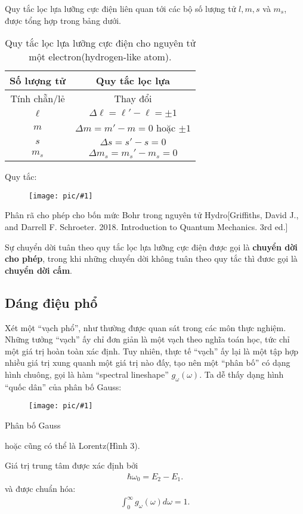 \documentclass{report}
\newcommand{\image}[1]{
\begin{figure}[H]
	\centering
	\texttt{[image: pic/\#1]}
	\label{#1}
\end{figure}
}
\renewcommand{\l}{\ell}
\begin{document}
Quy tắc lọc lựa lưỡng cực điện liên quan tới các bộ số lượng tử $l,m,s$ và $m_s$, được tổng hợp trong bảng dưới.

\begin{table}[h!]
	\centering
	\begin{tabular}{c | c}
		\hline
		Số lượng tử  & Quy tắc lọc lựa                      \\ [0.6ex]
		\hline
		Tính chẵn/lẻ & Thay đổi                             \\
		$\l$         & $\Delta \l = \l' - \l = \pm 1$       \\
		$m$          & $\Delta m = m' - m = 0$ hoặc $\pm 1$ \\
		$s$          & $\Delta s = s' - s = 0 $             \\
		$m_s$        & $\Delta m_s = m_s' - m_s = 0$        \\
		\hline
	\end{tabular}
	\caption{Quy tắc lọc lựa lưỡng cực điện cho nguyên tử một electron(hydrogen-like atom).}
\end{table}
\newpage
\noindent Quy tắc:
\image{selectionrule.png}{Phân rã cho phép cho bốn mức Bohr trong nguyên tử Hydro[Griffiths, David J., and Darrell F. Schroeter. 2018. Introduction to Quantum Mechanics. 3rd ed.]}

Sự chuyển dời tuân theo quy tắc lọc lựa lưỡng cực điện được gọi là \textbf{chuyển dời cho phép}, trong khi những chuyển dời không tuân theo quy tắc thì đươc gọi là \textbf{chuyển dời cấm}.

\subsection{Dáng điệu phổ}

Xét một ``vạch phổ'', như thường được quan sát trong các môn thực nghiệm. Những tưởng ``vạch'' ấy chỉ đơn giản là một vạch theo nghĩa toán học, tức chỉ một giá trị hoàn toàn xác định. Tuy nhiên, thực tế ``vạch'' ấy lại là một tập hợp nhiều giá trị xung quanh một giá trị nào đấy, tạo nên một ``phân bố'' có dạng hình chuông, gọi là hàm ``spectral lineshape'' $g_\omega(\omega)$.
Ta dễ thấy dạng hình ``quốc dân'' của phân bố Gauss:
\image{gauss.jpg}{Phân bố Gauss}

hoặc cũng có thể là Lorentz(Hình 3).

Giá trị trung tâm được xác định bởi
\begin{align*}
	\hbar\omega_0 = E_2 - E_1.
\end{align*}
và được chuẩn hóa:
\begin{align*}
	\int_{0}^{\infty}g_\omega(\omega)d\omega = 1.
\end{align*}
\end{document}
